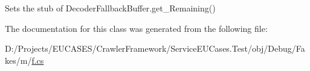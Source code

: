 Sets the stub of Decoder\-Fallback\-Buffer.\-get\-\_\-\-Remaining()



The documentation for this class was generated from the following file\-:\begin{DoxyCompactItemize}
\item 
D\-:/\-Projects/\-E\-U\-C\-A\-S\-E\-S/\-Crawler\-Framework/\-Service\-E\-U\-Cases.\-Test/obj/\-Debug/\-Fakes/m/\hyperlink{m_2f_8cs}{f.\-cs}\end{DoxyCompactItemize}
